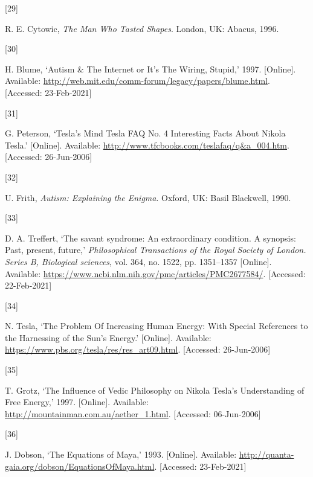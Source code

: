 \documentclass[
  12pt,
  british,
  a4paper,
]{article}
\newlength{\cslhangindent}
\newlength{\csllabelwidth}
\newenvironment{CSLReferences}[2] %
 {%
  \setlength{\parindent}{0pt}
  \ifodd #1 \everypar{\setlength{\hangindent}{\cslhangindent}}\ignorespaces\fi
  \ifnum #2 > 0
  \setlength{\parskip}{#2\baselineskip}
  \fi
 }%
 {}
\newcommand{\CSLLeftMargin}[1]{\parbox[t]{\csllabelwidth}{#1}}
\newcommand{\CSLRightInline}[1]{\parbox[t]{\linewidth - \csllabelwidth}{#1}\break}
\begin{document}
\begin{CSLReferences}{0}{0}
\leavevmode{}%
\CSLLeftMargin{{[}29{]} }
\CSLRightInline{R. E. Cytowic, \emph{{The Man Who Tasted Shapes}}.
London, UK: Abacus, 1996. }

\leavevmode{}%
\CSLLeftMargin{{[}30{]} }
\CSLRightInline{H. Blume, {`{Autism \& The Internet or It's The Wiring,
Stupid},'} 1997. {[}Online{]}. Available:
\url{http://web.mit.edu/comm-forum/legacy/papers/blume.html}.
{[}Accessed: 23-Feb-2021{]}}

\leavevmode{}%
\CSLLeftMargin{{[}31{]} }
\CSLRightInline{G. Peterson, {`{Tesla's Mind \textbar{} Tesla FAQ No. 4
\textbar{} Interesting Facts About Nikola Tesla}.'} {[}Online{]}.
Available: \url{http://www.tfcbooks.com/teslafaq/q\&a_004.htm}.
{[}Accessed: 26-Jun-2006{]}}

\leavevmode{}%
\CSLLeftMargin{{[}32{]} }
\CSLRightInline{U. Frith, \emph{{Autism: Explaining the Enigma}}.
Oxford, UK: Basil Blackwell, 1990. }

\leavevmode{}%
\CSLLeftMargin{{[}33{]} }
\CSLRightInline{D. A. Treffert, {`The savant syndrome: An extraordinary
condition. A synopsis: Past, present, future,'} \emph{Philosophical
Transactions of the Royal Society of London. Series B, Biological
sciences}, vol. 364, no. 1522, pp. 1351--1357 {[}Online{]}. Available:
\url{https://www.ncbi.nlm.nih.gov/pmc/articles/PMC2677584/}.
{[}Accessed: 22-Feb-2021{]}}

\leavevmode{}%
\CSLLeftMargin{{[}34{]} }
\CSLRightInline{N. Tesla, {`{The Problem Of Increasing Human Energy:
With Special References to the Harnessing of the Sun's Energy}.'}
{[}Online{]}. Available:
\url{https://www.pbs.org/tesla/res/res_art09.html}. {[}Accessed:
26-Jun-2006{]}}

\leavevmode{}%
\CSLLeftMargin{{[}35{]} }
\CSLRightInline{T. Grotz, {`{The Influence of Vedic Philosophy on Nikola
Tesla's Understanding of Free Energy},'} 1997. {[}Online{]}. Available:
\url{http://mountainman.com.au/aether_1.html}. {[}Accessed:
06-Jun-2006{]}}

\leavevmode{}%
\CSLLeftMargin{{[}36{]} }
\CSLRightInline{J. Dobson, {`{The Equations of Maya},'} 1993.
{[}Online{]}. Available:
\url{http://quanta-gaia.org/dobson/EquationsOfMaya.html}. {[}Accessed:
23-Feb-2021{]}}


\end{CSLReferences}
\end{document}
